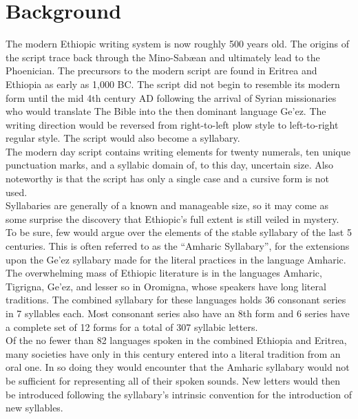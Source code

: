 \section*{Background}
The modern Ethiopic writing system is now roughly 500 years old.  The origins
of the script trace back through the Mino-Sab{\ae}an and ultimately lead to the Phoenician.
The precursors to the modern script are found in Eritrea and Ethiopia as early
as 1,000 BC.  The script did not begin to resemble its modern form until the mid
4th century AD following the arrival of Syrian missionaries who would translate
The Bible into the then dominant language Ge'ez.  The writing direction would be
reversed from right-to-left plow style to left-to-right regular style.  The script would
also become a syllabary.\\

The modern day script contains writing elements for twenty numerals, ten unique
punctuation marks, and a syllabic domain of, to this day, uncertain size.
Also noteworthy is that the script has only a single case and a cursive form
is not used. \\

Syllabaries are generally of a known and manageable size, so it may come as some
surprise the discovery that Ethiopic's full extent is still veiled in mystery.  To
be sure, few would argue over the elements of the stable syllabary of the last 5
centuries.  This is often referred to as the ``Amharic Syllabary'', for the
extensions upon the Ge'ez syllabary made for the literal practices in the language
Amharic.  The overwhelming mass of Ethiopic literature is in the languages Amharic,
Tigrigna, Ge'ez, and lesser so in Oromigna, whose speakers have long literal
traditions.  The combined syllabary for these languages holds 36 consonant series
in 7 syllables each.  Most consonant series also have an 8th form and 6 series
have a complete set of 12 forms for a total of 307 syllabic letters.\\
%
%

Of the no fewer than 82 languages spoken in the combined Ethiopia and Eritrea,
many societies have only in this century entered into a literal tradition from
an oral one.  In so doing they would encounter that the Amharic syllabary would
not be sufficient for representing all of their spoken sounds.  New letters
would then be introduced following the syllabary's intrinsic convention for the
introduction of new syllables.\\

